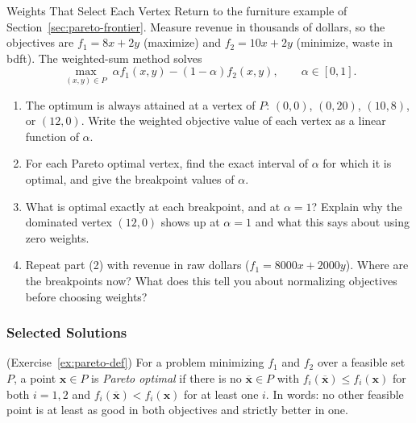 
\begin{ex}{Weights That Select Each Vertex}{}
\label{ex:furniture-weights}
Return to the furniture example of Section~\ref{sec:pareto-frontier}. Measure revenue in thousands of dollars, so the objectives are $f_1 = 8x + 2y$ (maximize) and $f_2 = 10x + 2y$ (minimize, waste in bdft). The weighted-sum method solves
\[
\max_{(x,y) \in P} \; \alpha f_1(x,y) - (1-\alpha) f_2(x,y), \qquad \alpha \in [0,1].
\]
\begin{enumerate}
\item The optimum is always attained at a vertex of $P$: $(0,0)$, $(0,20)$, $(10,8)$, or $(12,0)$. Write the weighted objective value of each vertex as a linear function of $\alpha$.
\item For each Pareto optimal vertex, find the exact interval of $\alpha$ for which it is optimal, and give the breakpoint values of $\alpha$.
\item What is optimal exactly at each breakpoint, and at $\alpha = 1$? Explain why the dominated vertex $(12,0)$ shows up at $\alpha = 1$ and what this says about using zero weights.
\item Repeat part (2) with revenue in raw dollars ($f_1 = 8000x + 2000y$). Where are the breakpoints now? What does this tell you about normalizing objectives before choosing weights?
\end{enumerate}
\end{ex}

\subsubsection*{Selected Solutions}

\begin{solution}(Exercise~\ref{ex:pareto-def})
For a problem minimizing $f_1$ and $f_2$ over a feasible set $P$, a point $\mathbf{x} \in P$ is \emph{Pareto optimal} if there is no $\overline{\mathbf{x}} \in P$ with $f_i(\overline{\mathbf{x}}) \leq f_i(\mathbf{x})$ for both $i = 1, 2$ and $f_i(\overline{\mathbf{x}}) < f_i(\mathbf{x})$ for at least one $i$.  In words: no other feasible point is at least as good in both objectives and strictly better in one.
\end{solution}

